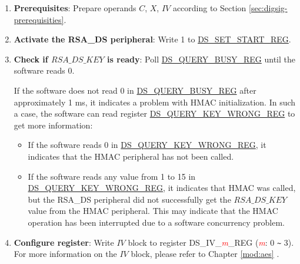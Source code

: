 \documentclass[main\_\_EN.tex]{subfiles}
\begin{document}
\begin{enumerate}
    
    \item {\bfseries Prerequisites}: Prepare operands \begin{math}C\end{math}, \begin{math}X\end{math}, \begin{math}IV\end{math} according to Section \ref{sec:digsig-prerequisities}.
    
    \item {\bfseries Activate the RSA\_DS peripheral}: Write 1 to \hyperref[regdesc:DSSETSTARTREG]{DS\_SET\_START\_REG}.
    
    \item {\bfseries Check if \begin{math}RSA\_DS\_KEY\end{math} is ready}: Poll \hyperref[regdesc:DSQUERYBUSYREG]{DS\_QUERY\_BUSY\_REG} until the software reads 0.
    
    If the software does not read 0 in \hyperref[regdesc:DSQUERYBUSYREG]{DS\_QUERY\_BUSY\_REG} after approximately 1 ms, it indicates a problem with HMAC initialization. In such a case, the software can read register \hyperref[regdesc:DSQUERYKEYWRONGREG]{DS\_QUERY\_KEY\_WRONG\_REG} to get more information:
    
    \begin{itemize}
    
        \item If the software reads 0 in \hyperref[regdesc:DSQUERYKEYWRONGREG]{DS\_QUERY\_KEY\_WRONG\_REG}, it indicates that the HMAC peripheral has not been called.
        
        \item If the software reads any value from 1 to 15 in \hyperref[regdesc:DSQUERYKEYWRONGREG]{DS\_QUERY\_KEY\_WRONG\_REG}, it indicates that HMAC was called, but the RSA\_DS peripheral did not successfully get the \begin{math}RSA\_DS\_KEY\end{math} value from the HMAC peripheral. This may indicate that the HMAC operation has been interrupted due to a software concurrency problem.
        
    \end{itemize}
    
    \item {\bfseries Configure register}: Write \begin{math}IV\end{math} block to register DS\_IV\_\textcolor{red}{\it{m}}\_REG (\textcolor{red}{\it{m}}: 0 \verb+~+ 3). For more information on the \begin{math}IV\end{math} block, please refer to Chapter \ref{mod:aes} \textit{}.


\end{enumerate}
\end{document}
